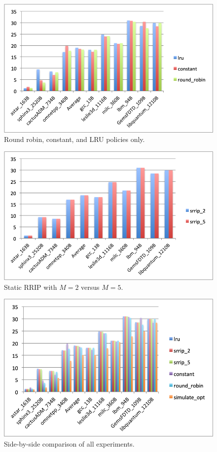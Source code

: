 \documentclass[9pt]{article}
\begin{document}
\begin{figure}[t]
  \centering
  \includegraphics[height=.45\textheight]{round_robin_versus_constant.png}
  \caption{Round robin, constant, and LRU policies only.}
\end{figure}

\begin{figure}[t]
  \centering
  \includegraphics[height=.45\textheight]{ssrip_parameters.png}
  \caption{Static RRIP with $M = 2$ versus $M = 5$.}
\end{figure}

\begin{figure}[t]
  \centering
  \includegraphics[height=.45\textheight]{everything.png}
  \caption{Side-by-side comparison of all experiments.}
\end{figure}
\end{document}
